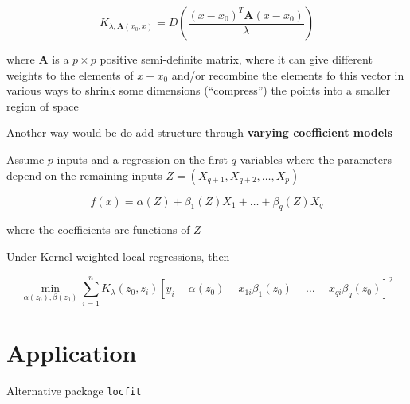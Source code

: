 \documentclass[
]{book}
\begin{document}
\[
K_{\lambda, \mathbf{A}(x_0, x)}= D(\frac{(x-x_0)^T \mathbf{A}(x-x_0)}{\lambda})
\]

where \(\mathbf{A}\) is a \(p \times p\) positive semi-definite matrix, where it can give different weights to the elements of \(x-x_0\) and/or recombine the elements fo this vector in various ways to shrink some dimensions (``compress'') the points into a smaller region of space

Another way would be do add structure through \textbf{varying coefficient models}

Assume \(p\) inputs and a regression on the first \(q\) variables where the parameters depend on the remaining inputs \(Z= (X_{q+1}, X_{q+2}, \dots, X_p)\)

\[
f(x) = \alpha (Z) + \beta_1 (Z) X_1 + \dots + \beta_q (Z) X_q
\]

where the coefficients are functions of \(Z\)

Under Kernel weighted local regressions, then

\[
\min_{\alpha (z_0), \beta(z_0)} \sum_{i=1}^n K_\lambda (z_0,z_i)[y_i - \alpha(z_0)-x_{1i} \beta_1(z_0)- \dots - x_{qi} \beta_q (z_0)]^2
\]

\hypertarget{application-1}{%
\section{Application}\label{application-1}}

Alternative package \texttt{locfit}
\end{document}
